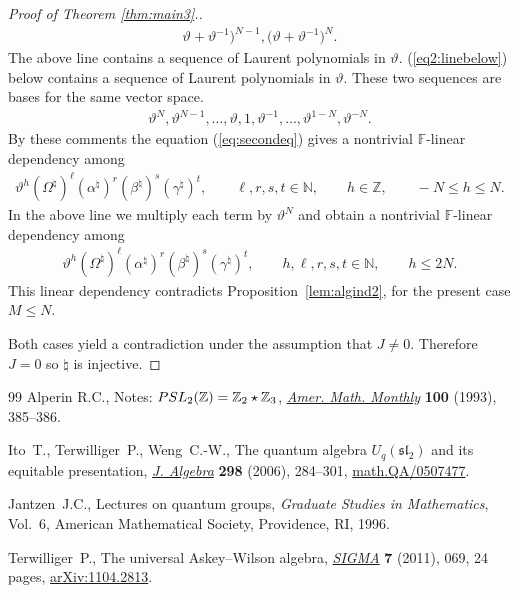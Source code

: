 \documentclass[11pt]{article}
\numberwithin{equation}{section}
\begin{document}
\begin{proof}[Proof of Theorem \ref{thm:main3}.]
\begin{gather*}
\vartheta
+
\vartheta^{-1}\big)^{N-1},
\big(
\vartheta
+
\vartheta^{-1}\big)^N.
\end{gather*}
The above line
contains a sequence of
Laurent polynomials in $\vartheta$.
(\ref{eq2:linebelow})
below contains a sequence of
Laurent polynomials in $\vartheta$.
These two sequences are bases for the same vector space.
\begin{gather}
\label{eq2:linebelow}
\vartheta^N,  \vartheta^{N-1},  \ldots,  \vartheta,   1,
 \vartheta^{-1},
 \ldots,
 \vartheta^{1-N},
 \vartheta^{-N}.
\end{gather}
By these comments the  equation
(\ref{eq:secondeq})
gives a
 nontrivial $\mathbb F$-linear dependency
among
\begin{gather*}
\vartheta^h
(\Omega^\natural)^\ell (\alpha^\natural)^r (\beta^\natural)^s
(\gamma^\natural)^t,
 \qquad \ell, r,s,t \in \mathbb N, \qquad
h \in \mathbb Z, \qquad   -N \leq h \leq N.
\end{gather*}
In the above line we multiply each term by $\vartheta^N$ and
obtain
a nontrivial $\mathbb F$-linear dependency among
\begin{gather*}
\vartheta^h
(\Omega^\natural)^\ell (\alpha^\natural)^r
(\beta^\natural)^s (\gamma^\natural)^t
, \qquad h,\ell, r,s,t \in \mathbb N , \qquad
 h \leq 2N.
\end{gather*}
This linear dependency
contradicts
Proposition~\ref{lem:algind2},
for the present case
 $M\leq N$.


Both cases yield a contradiction
under the assumption
that $J\not=0$.
Therefore $J=0$ so $\natural$ is injective.
\end{proof}
\begin{thebibliography}{99}
Alperin R.C.,
Notes: ${\rm  {PSL}}_2(\mathbb Z)= \mathbb Z_2 \star \mathbb Z_3$,
\href{http://dx.doi.org/10.2307/2324963}{{\it Amer. Math. Monthly}} {\bf 100} (1993), 385--386.

Ito~T., Terwilliger~P., Weng~C.-W.,
The quantum algebra $U_q(\mathfrak{sl}_2)$ and its equitable presentation,
\href{http://dx.doi.org/10.1016/j.jalgebra.2005.07.038}{{\em J. Algebra}}  {\bf 298}  (2006), 284--301,
\href{http://arxiv.org/abs/math.QA/0507477}{math.QA/0507477}.


Jantzen~J.C.,
Lectures on quantum groups,
{\it Graduate Studies in Mathematics}, Vol.~6,
American Mathema\-ti\-cal Society, Providence, RI, 1996.

Terwilliger~P.,
The universal Askey--Wilson algebra,
\href{http://dx.doi.org/10.3842/SIGMA.2011.069}{{\em SIGMA}} {\bf 7} (2011), 069, 24 pages,
\href{http://arxiv.org/abs/1104.2813}{arXiv:1104.2813}.

\end{thebibliography}
\end{document}
